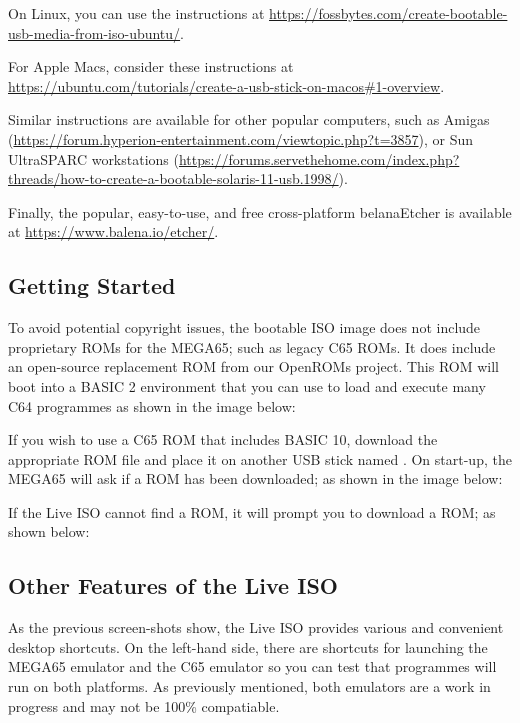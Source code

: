 On Linux, you can use the instructions at \url{https://fossbytes.com/create-bootable-usb-media-from-iso-ubuntu/}.

For Apple Macs, consider these instructions at
\url{https://ubuntu.com/tutorials/create-a-usb-stick-on-macos#1-overview}.

Similar instructions are available for other popular computers, such as Amigas (\url{https://forum.hyperion-entertainment.com/viewtopic.php?t=3857}), or Sun UltraSPARC workstations (\url{https://forums.servethehome.com/index.php?threads/how-to-create-a-bootable-solaris-11-usb.1998/}).

Finally, the popular, easy-to-use, and free cross-platform belanaEtcher is available at \url{https://www.balena.io/etcher/}.

\subsection{Getting Started}

To avoid potential copyright issues, the bootable ISO image does not include proprietary ROMs for the MEGA65; such as legacy C65 ROMs. It does include an open-source replacement ROM from our OpenROMs project. This ROM will boot into a BASIC 2 environment that you can use to load and execute many C64 programmes as shown in the image below:


If you wish to use a C65 ROM that includes BASIC 10, download the appropriate ROM file and place it on another USB stick named . On start-up, the MEGA65 will ask if a ROM has been downloaded; as shown in the image below:


If the Live ISO cannot find a ROM, it will prompt you to download a ROM; as shown below:


\subsection{Other Features of the Live ISO}

As the previous screen-shots show, the Live ISO provides various and convenient desktop shortcuts. On the left-hand side, there are shortcuts for launching the
MEGA65 emulator and the C65 emulator so you can test that programmes
will run on both platforms. As previously mentioned, both emulators are a work in progress and may not be 100\% compatiable.

